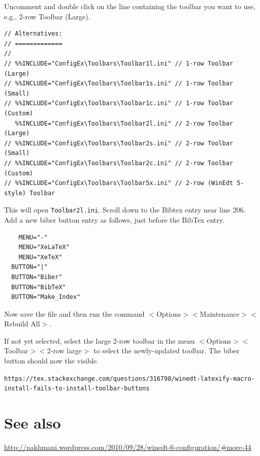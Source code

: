 Uncomment and double click on the line containing the toolbar you want to use, e.g.,  2-row Toolbar (Large).

\begin{lstlisting}
// Alternatives:
// =============
//
// %%INCLUDE="ConfigEx\Toolbars\Toolbar1l.ini" // 1-row Toolbar (Large)
// %%INCLUDE="ConfigEx\Toolbars\Toolbar1s.ini" // 1-row Toolbar (Small)
// %%INCLUDE="ConfigEx\Toolbars\Toolbar1c.ini" // 1-row Toolbar (Custom)
   %%INCLUDE="ConfigEx\Toolbars\Toolbar2l.ini" // 2-row Toolbar (Large)
// %%INCLUDE="ConfigEx\Toolbars\Toolbar2s.ini" // 2-row Toolbar (Small)
// %%INCLUDE="ConfigEx\Toolbars\Toolbar2c.ini" // 2-row Toolbar (Custom)
// %%INCLUDE="ConfigEx\Toolbars\Toolbar5x.ini" // 2-row (WinEdt 5-style) Toolbar
\end{lstlisting}

This will open \lstinline{Toolbar2l.ini}. Scroll down to the Bibtex entry near line 206.  Add a new biber button entry as follows, just before the BibTex entry.

\begin{lstlisting}
    MENU="-"
    MENU="XeLaTeX"
    MENU="XeTeX"
  BUTTON="|"
  BUTTON="Biber"
  BUTTON="BibTeX"
  BUTTON="Make_Index"
\end{lstlisting}

Now save the file and then run the command $<$Options$>$$<$Maintenance$>$$<$Rebuild All$>$.

If not yet selected, select the large 2-row toolbar in the menu
$<$Options$>$$<$Toolbar$>$$<$2-row large$>$ to select the newly-updated toolbar.  The biber button should now the visible.


\lstinline{https://tex.stackexchange.com/questions/316798/winedt-latexify-macro-install-fails-to-install-toolbar-buttons}

\section{See also}

\url{http://nakhmani.wordpress.com/2010/09/28/winedt-6-configuration/#more-44}


